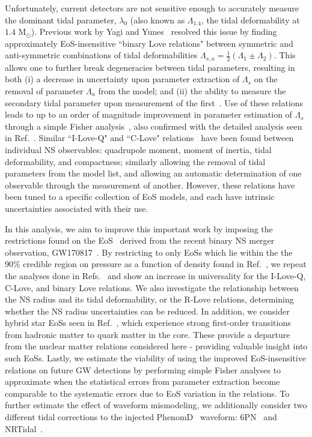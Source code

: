 \documentclass[prd,twocolumn,nofootinbib,superscriptaddress,amsmath,amssymb]{revtex4-1}
\begin{document}
Unfortunately, current detectors are not sensitive enough to accurately measure the dominant tidal parameter, $\lambda_0$ (also known as $\Lambda_{1.4}$, the tidal deformability at $1.4 \text{ M}_{\odot}$).
Previous work by Yagi and Yunes~\cite{Yagi:binLove} resolved this issue by finding approximately EoS-insensitive ``binary Love relations" between symmetric and anti-symmetric combinations of tidal deformabilities $\Lambda_{s,a}=\frac{1}{2}(\Lambda_1 \pm \Lambda_2)$.
This allows one to further break degeneracies between tidal parameters, resulting in both (i) a decrease in uncertainty upon parameter extraction of $\Lambda_s$ on the removal of parameter $\Lambda_a$ from the model; and (ii) the ability to measure the secondary tidal parameter upon measurement of the first~\cite{Katerina:residuals}.  
Use of these relations leads to up to an order of magnitude improvement in parameter estimation of $\Lambda_s$ through a simple Fisher analysis~\cite{Yagi:binLove}, also confirmed with the detailed analysis seen in Ref.~\cite{Katerina:residuals}.
Similar ``I-Love-Q" and ``C-Love" relations~\cite{Yagi:ILQ} have been found between individual NS observables: quadrupole moment, moment of inertia, tidal deformability, and compactness; similarly allowing the removal of tidal parameters from the model list, and allowing an automatic determination of one observable through the measurement of another.
However, these relations have been tuned to a specific collection of EoS models, and each have intrinsic uncertainties associated with their use.

In this analysis, we aim to improve this important work by imposing the restrictions found on the EoS~\cite{LIGO:posterior} derived from the recent binary NS merger observation, GW170817~\cite{TheLIGOScientific:2017qsa}.
By restricting to only EoSs which lie within the the 90\% credible region on pressure as a function of density found in Ref.~\cite{LIGO:posterior}, we repeat the analyses done in Refs.~\cite{Yagi:binLove,Yagi:ILQ} and show an increase in universality for the I-Love-Q, C-Love, and binary Love relations.
We also investigate the relationship between the NS radius and its tidal deformability, or the R-Love relations, determining whether the NS radius uncertainties can be reduced.
In addition, we consider hybrid star EoSs seen in Ref.~\cite{Paschalidis2018}, which experience strong first-order transitions from hadronic matter to quark matter in the core.
These provide a departure from the nuclear matter relations considered here - providing valuable insight into such EoSs.
Lastly, we estimate the viability of using the improved EoS-insensitive relations on future GW detections by performing simple Fisher analyses to approximate when the statistical errors from parameter extraction become comparable to the systematic errors due to EoS variation in the relations.
To further estimate the effect of waveform mismodeling, we additionally consider two different tidal corrections to the injected PhenomD~\cite{PhenomDI,PhenomDII} waveform: 6PN~\cite{Wade:tidalCorrections} and NRTidal~\cite{Samajdar:NRTidal}.
\end{document}
